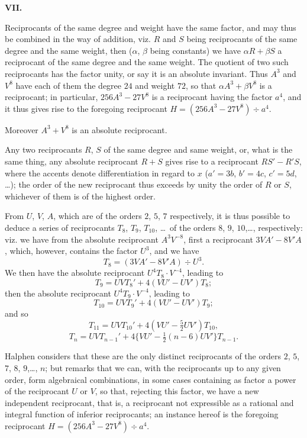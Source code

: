 \documentclass[11pt,a4paper]{book}
\begin{document}
\medskip

\noindent\textbf{VII.}

Reciprocants of the same degree and weight have the same factor, and may thus be combined in the way of addition, viz.
$R$ and $S$ being reciprocants of the same degree and the same weight, then ($\alpha$, $\beta$ being constants) we have $\alpha R + \beta S$ a reciprocant of the same degree and the same weight.
The quotient of two such reciprocants has the factor unity, or say it is an absolute invariant.
Thus $A^3$ and $V^8$ have each of them the degree $24$ and weight $72$, so that $\alpha A^3 + \beta V^8$ is a reciprocant; in particular, $256A^3 - 27V^8$ is a reciprocant having the factor $a^4$, and it thus gives rise to the foregoing reciprocant $H = (256A^3 - 27V^8) \div a^4$.

Moreover $A^3 + V^8$ is an absolute reciprocant.

Any two reciprocants $R$, $S$ of the same degree and same weight, or, what is the same thing, any absolute reciprocant $R + S$ gives rise to a reciprocant $RS' - R'S$, where the accents denote differentiation in regard to $x$ ($a' = 3b$, $b' = 4c$, $c' = 5d$, \dots); the order of the new reciprocant thus exceeds by unity the order of $R$ or $S$, whichever of them is of the highest order.

From $U$, $V$, $A$, which are of the orders $2$, $5$, $7$ respectively, it is thus possible to deduce a series of reciprocants $T_8$, $T_9$, $T_{10}$, \dots\ of the orders $8$, $9$, $10$,\dots, respectively: viz.
we have from the absolute reciprocant $A^3V^{-8}$, first a reciprocant $3VA' - 8V'A$, which, however, contains the factor $U^3$, and we have
\[
T_8 = (3VA' - 8V'A) \div U^3.
\]
We then have the absolute reciprocant $U^4T_8 \cdot V^{-4}$, leading to
\[
T_9 = UVT_8' + 4(VU' - UV')T_8;
\]
then the absolute reciprocant $U^4T_9 \cdot V^{-4}$, leading to
\[
T_{10} = UVT_9' + 4(VU' - UV')T_9;
\]
and so
\[
T_{11} = UVT_{10}' + 4(VU' - \tfrac{5}{2}UV')T_{10},
\]
\[
T_n = UVT_{n-1}' + 4\{VU' - \tfrac{1}{2}(n-6)UV'\}T_{n-1}.
\]

Halphen considers that these are the only distinct reciprocants of the orders $2$, $5$, $7$, $8$, $9$,\dots, $n$; but remarks that we can, with the reciprocants up to any given order, form algebraical combinations, in some cases containing as factor a power of the reciprocant $U$ or $V$, so that, rejecting this factor, we have a new independent reciprocant, that is, a reciprocant not expressible as a rational and integral function of inferior reciprocants; an instance hereof is the foregoing reciprocant $H = (256A^3 - 27V^8) \div a^4$.
\end{document}
